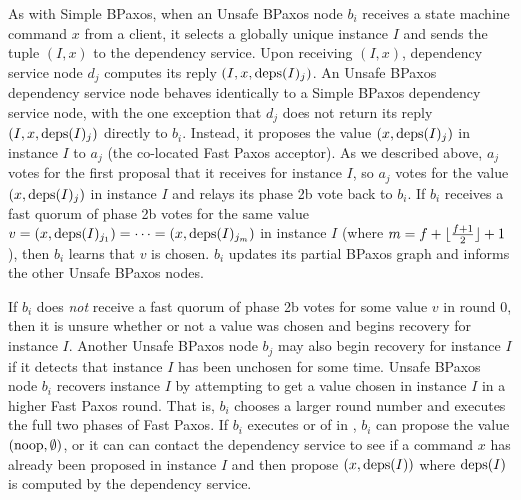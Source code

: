 As with Simple BPaxos, when an Unsafe BPaxos node $b_i$ receives a state
machine command $x$ from a client, it selects a globally unique instance $I$
and sends the tuple $(I, x)$ to the dependency service. Upon receiving $(I,
x)$, dependency service node $d_j$ computes its reply $(I, x, \text{deps}(I)_j)$.  An
Unsafe BPaxos dependency service node behaves identically to a Simple BPaxos
dependency service node, with the one exception that $d_j$ does not return its
reply $(I, x, \text{deps}(I)_j)$ directly to $b_i$. Instead, it proposes the value
$(x, \text{deps}(I)_j)$ in instance $I$ to $a_j$ (the co-located Fast Paxos
acceptor). As we described above, $a_j$ votes for the first proposal that it
receives for instance $I$, so $a_j$ votes for the value $(x, \text{deps}(I)_j)$ in
instance $I$ and relays its phase 2b vote back to $b_i$.
%
If $b_i$ receives a fast quorum of phase 2b votes for the same value $v = (x,
\text{deps}(I)_{j_1}) = \cdots = (x, \text{deps}(I)_{j_m})$ in instance $I$ (where $m =
f + \lfloor\frac{f + 1}{2}\rfloor + 1$), then $b_i$ learns that $v$ is chosen. $b_i$ updates its
partial BPaxos graph and informs the other Unsafe BPaxos nodes.

If $b_i$ does \emph{not} receive a fast quorum of phase 2b votes for some value
$v$ in round 0, then it is unsure whether or not a value was chosen and begins
recovery for instance $I$. Another Unsafe BPaxos node $b_j$ may also begin
recovery for instance $I$ if it detects that instance $I$ has been unchosen for
some time.
%
Unsafe BPaxos node $b_i$ recovers instance $I$ by attempting to get a value
chosen in instance $I$ in a higher Fast Paxos round. That is, $b_i$ chooses a
larger round number and executes the full two phases of Fast Paxos. If $b_i$
executes  or  of
 in , $b_i$ can propose the value
$(\text{noop}, \emptyset)$, or it can can contact the dependency service to see if a
command $x$ has already been proposed in instance $I$ and then propose $(x,
\text{deps}(I))$ where $\text{deps}(I)$ is computed by the dependency service.

